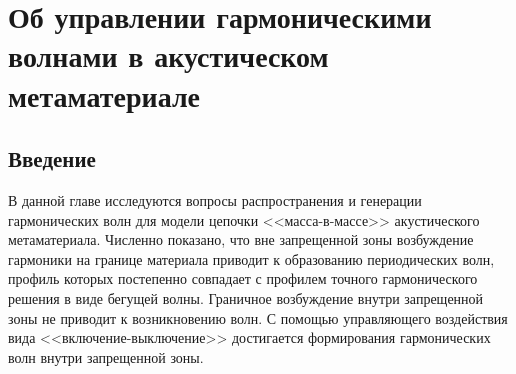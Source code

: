 \chapter{Об управлении гармоническими волнами в акустическом метаматериале}

  
\section{Введение}


В данной главе исследуются вопросы распространения и генерации гармонических волн для модели цепочки <<масса-в-массе>> \cite{Huang2009} акустического метаматериала. Численно показано, что вне запрещенной зоны возбуждение гармоники на границе материала приводит к образованию периодических волн, профиль которых постепенно совпадает с профилем точного гармонического решения в виде бегущей волны. Граничное возбуждение внутри запрещенной зоны не приводит к возникновению волн. С помощью управляющего воздействия вида <<включение-выключение>> достигается формирования гармонических волн внутри запрещенной зоны.


